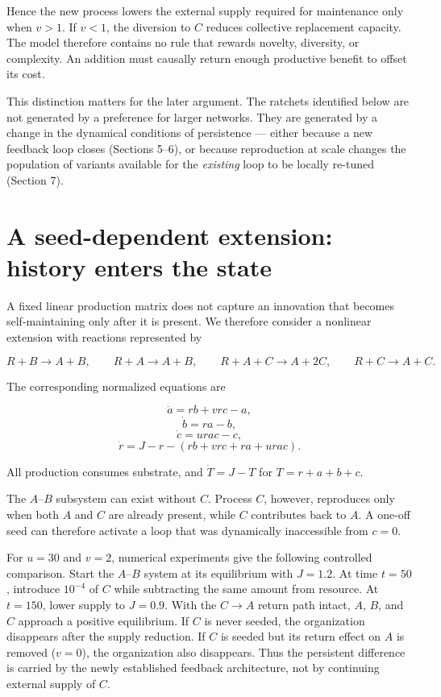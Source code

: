 \documentclass[11pt]{article}
\begin{document}
Hence the new process lowers the external supply required for
maintenance only when \(v > 1\). If \(v < 1\), the diversion to \(C\)
reduces collective replacement capacity. The model therefore contains no
rule that rewards novelty, diversity, or complexity. An addition must
causally return enough productive benefit to offset its cost.

This distinction matters for the later argument. The ratchets identified
below are not generated by a preference for larger networks. They are
generated by a change in the dynamical conditions of persistence ---
either because a new feedback loop closes (Sections 5--6), or because
reproduction at scale changes the population of variants available for
the \emph{existing} loop to be locally re-tuned (Section 7).

\section{A seed-dependent extension: history enters the
state}
A fixed linear production matrix does not capture an innovation that
becomes self-maintaining only after it is present. We therefore consider
a nonlinear extension with reactions represented by

\[
R + B \to A + B, \qquad R + A \to A + B, \qquad R + A + C \to A + 2C, \qquad R + C \to A + C.
\]

The corresponding normalized equations are

\[
\dot a = rb + vrc - a, \tag{4}
\] \[
\dot b = ra - b, \tag{5}
\] \[
\dot c = urac - c, \tag{6}
\] \[
\dot r = J - r - (rb + vrc + ra + urac). \tag{7}
\]

All production consumes substrate, and \(\dot T = J - T\) for
\(T = r+a+b+c\).

The \(A\)--\(B\) subsystem can exist without \(C\). Process \(C\),
however, reproduces only when both \(A\) and \(C\) are already present,
while \(C\) contributes back to \(A\). A one-off seed can therefore
activate a loop that was dynamically inaccessible from \(c=0\).

For \(u=30\) and \(v=2\), numerical experiments give the following
controlled comparison. Start the \(A\)--\(B\) system at its equilibrium
with \(J=1.2\). At time \(t=50\), introduce \(10^{-4}\) of \(C\) while
subtracting the same amount from resource. At \(t=150\), lower supply to
\(J=0.9\). With the \(C \to A\) return path intact, \(A\), \(B\), and
\(C\) approach a positive equilibrium. If \(C\) is never seeded, the
organization disappears after the supply reduction. If \(C\) is seeded
but its return effect on \(A\) is removed (\(v=0\)), the organization
also disappears. Thus the persistent difference is carried by the newly
established feedback architecture, not by continuing external supply of
\(C\).
\end{document}
